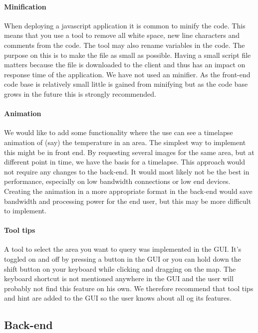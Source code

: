 \documentclass[11pt,a4paper,titlepage,oneside]{report}
\begin{document}
\paragraph{Minification}
When deploying a javascript application it is common to minify the code. This means that you use a tool to remove all white space, new line characters and comments from the code. The tool may also rename variables in the code. The purpose on this is to make the file as small as possible. Having a small script file matters because the file is downloaded to the client and thus has an impact on response time of the application. We have not used an minifier. As the \gls{front-end} code base is relatively small little is gained from minifying but as the code base grows in the future this is strongly recommended.

\paragraph{Animation}
We would like to add some functionality where the use can see a timelapse animation of (say) the temperature in an area. The simplest way to implement this might be in front end. By requesting several images for the same area, but at different point in time, we have the basis for a timelapse. This approach would not require any changes to the back-end. It would most likely not be the best in performance, especially on low bandwidth connections or low end devices. Creating the animation in a more appropriate format in the back-end would save bandwidth and processing power for the end user, but this may be more difficult to implement.

\paragraph{Tool tips}
A tool to select the area you want to query was implemented in the \gls{GUI}. It's toggled on and off by pressing a button in the \gls{GUI} or you can hold down the shift button on your keyboard while clicking and dragging on the map. The keyboard shortcut is not mentioned anywhere in the \gls{GUI} and the user will probably not find this feature on his own. We therefore recommend that tool tips and hint are added to the \gls{GUI} so the user knows about all og its features.


\subsection{Back-end}
\end{document}
